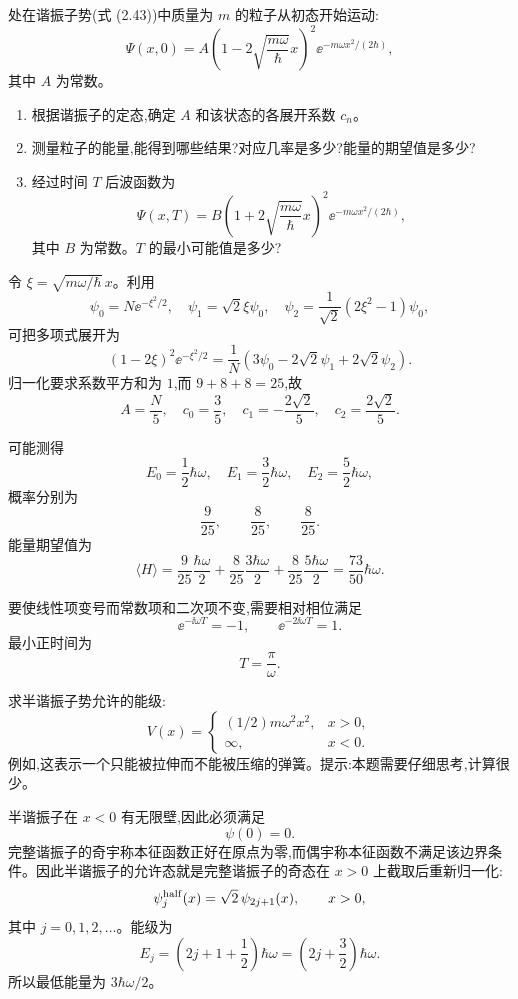 \begin{question}
处在谐振子势(式 (2.43))中质量为 $m$ 的粒子从初态开始运动:
\[
\Psi(x,0)=A\left(1-2\sqrt{\frac{m\omega}{\hbar}}x\right)^2 \ee^{-m\omega x^2/(2\hbar)},
\]
其中 $A$ 为常数。
\begin{enumerate}
\item 根据谐振子的定态,确定 $A$ 和该状态的各展开系数 $c_n$。
\item 测量粒子的能量,能得到哪些结果?对应几率是多少?能量的期望值是多少?
\item 经过时间 $T$ 后波函数为
\[
\Psi(x,T)=B\left(1+2\sqrt{\frac{m\omega}{\hbar}}x\right)^2 \ee^{-m\omega x^2/(2\hbar)},
\]
其中 $B$ 为常数。$T$ 的最小可能值是多少?
\end{enumerate}

\par\smallskip
{}

\begin{solution}
令 $\xi=\sqrt{m\omega/\hbar}\,x$。利用
\[
\psi_0=N \ee^{-\xi^2/2},\quad
\psi_1=\sqrt2\xi\psi_0,
\quad
\psi_2=\frac1{\sqrt2}(2\xi^2-1)\psi_0,
\]
可把多项式展开为
\[
(1-2\xi)^2\ee^{-\xi^2/2}
=\frac1N\left(3\psi_0-2\sqrt2\psi_1+2\sqrt2\psi_2\right).
\]
归一化要求系数平方和为 $1$,而 $9+8+8=25$,故
\[
A=\frac{N}{5},
\quad
c_0=\frac35,
\quad
c_1=-\frac{2\sqrt2}{5},
\quad
c_2=\frac{2\sqrt2}{5}.
\]

可能测得
\[
E_0=\frac12\hbar\omega,
\quad E_1=\frac32\hbar\omega,
\quad E_2=\frac52\hbar\omega,
\]
概率分别为
\[
\frac9{25},\qquad \frac8{25},\qquad \frac8{25}.
\]
能量期望值为
\[
\langle H\rangle=\frac9{25}\frac{\hbar\omega}{2}
+\frac8{25}\frac{3\hbar\omega}{2}
+\frac8{25}\frac{5\hbar\omega}{2}
=\frac{73}{50}\hbar\omega.
\]

要使线性项变号而常数项和二次项不变,需要相对相位满足
\[
\ee^{-\ii\omega T}=-1,
\qquad \ee^{-2\ii\omega T}=1.
\]
最小正时间为
\[
T=\frac{\pi}{\omega}.
\]
\end{solution}
\end{question}

\begin{question}
求半谐振子势允许的能级:
\[
V(x)=\begin{cases}(1/2)m\omega^2x^2,&x>0,\\ \infty,&x<0.
\end{cases}
\]
例如,这表示一个只能被拉伸而不能被压缩的弹簧。提示:本题需要仔细思考,计算很少。
\begin{solution}
半谐振子在 $x<0$ 有无限壁,因此必须满足
\[
\psi(0)=0.
\]
完整谐振子的奇宇称本征函数正好在原点为零,而偶宇称本征函数不满足该边界条件。因此半谐振子的允许态就是完整谐振子的奇态在 $x>0$ 上截取后重新归一化:
\[
\psi^{\rm half}_j(x)=\sqrt2\,\psi_{2j+1}(x),\qquad x>0,
\]
其中 $j=0,1,2,\ldots$。能级为
\[
E_j=\left(2j+1+\frac12\right)\hbar\omega
=\left(2j+\frac32\right)\hbar\omega.
\]
所以最低能量为 $3\hbar\omega/2$。
\end{solution}
\end{question}

